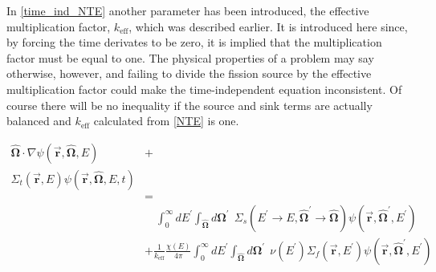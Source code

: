 In \eqref{time_ind_NTE} another parameter has been introduced, the effective multiplication factor, $k_\mathrm{eff}$, which was described earlier.  It is introduced here since, by forcing the time derivates to be zero, it is implied that the multiplication factor must be equal to one.  The physical properties of a problem may say otherwise, however, and failing to divide the fission source by the effective multiplication factor could make the time-independent equation inconsistent.  Of course there will be no inequality if the source and sink terms are actually balanced and $k_\mathrm{eff}$ calculated from \eqref{NTE} is one.  

\begin{equation}
\label{time_ind_NTE}
\begin{split}
\boldsymbol{\hat{\Omega}}  \cdot \nabla \psi(\boldsymbol{\vec{r}},\boldsymbol{\hat{\Omega}},E) &+ \\
\Sigma_t(\boldsymbol{\vec{r}},E) \psi(\boldsymbol{\vec{r}},\boldsymbol{\hat{\Omega}},E,t) & \\
& =  \\
& \quad \int_0^\infty dE^\prime   \int_{\boldsymbol{\hat{\Omega}}} d\boldsymbol{\Omega}^\prime \:\: \Sigma_s(E^\prime \rightarrow E,\boldsymbol{\hat{\Omega}}^\prime \rightarrow \boldsymbol{\hat{\Omega}}) \psi(\boldsymbol{\vec{r}},\boldsymbol{\hat{\Omega}}^\prime,E^\prime)  \\
&+ \frac{1}{k_{\mathrm{eff}}}\frac{\chi(E)}{4\pi} \int_0^\infty dE^\prime  \int_{\boldsymbol{\hat{\Omega}}}  d\boldsymbol{\Omega}^\prime \:\:  \nu(E^\prime) \Sigma_f(\boldsymbol{\vec{r}},E^\prime) \psi(\boldsymbol{\vec{r}},\boldsymbol{\hat{\Omega}}^\prime,E^\prime)  \\
\end{split}
 \end{equation}
 



